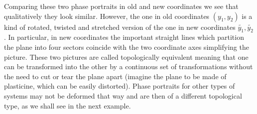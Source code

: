 \documentclass[11pt,a4paper,twoside]{article}
\begin{document}
Comparing these two phase portraits in old and new coordinates we see that qualitatively they look similar. However, the one in old coordinates $(y_1, y_2)$ is a kind of rotated, twisted and stretched version of the one in new coordinates $\tilde{y_1}, \tilde{y_2}$. In particular, in new coordinates the important straight lines which partition the plane into four sectors coincide with the two coordinate axes simplifying the picture. These two pictures are called topologically equivalent meaning that one can be transformed into the other by a continuous set of transformations without the need to cut or tear the plane apart (imagine the plane to be made of plasticine, which can be easily distorted). Phase portraits for other types of systems may not be deformed that way and are then of a different topological type, as we shall see in the next example.
\end{document}
